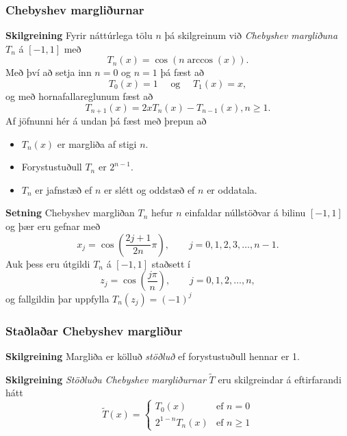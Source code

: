 \documentclass[icelandic,a4paper,12pt]{article}
\begin{document}
\subsubsection{Chebyshev margliðurnar}
 \textbf{Skilgreining}
  Fyrir náttúrlega tölu $n$ þá skilgreinum við \emph{Chebyshev margliðuna}
  $T_n$ á $[-1,1]$ með 
  $$
    T_n(x) = \cos(n \arccos(x)).
  $$
 \pause
 Með því að setja inn $n=0$ og $n=1$ þá fæst að 
 $$
  T_0(x) = 1 \quad \text{ og } \quad T_1(x) = x,
 $$
\pause og með hornafallareglunum fæst að 
  $$
    T_{n+1}(x) = 2xT_n(x) - T_{n-1}(x), n \geq 1.
  $$
\pause
 Af jöfnunni hér á undan þá fæst með þrepun að \pause
  \begin{itemize}
   \item $T_n(x)$ er margliða af stigi $n$.\pause
   \item Forystustuðull $T_n$ er $2^{n-1}$.\pause
   \item $T_n$ er jafnstæð ef $n$ er slétt og oddstæð ef $n$ er oddatala.
  \end{itemize}

 


 \textbf{Setning}
  Chebyshev margliðan $T_n$ hefur $n$ einfaldar núllstöðvar á bilinu $[-1,1]$ \pause
  og þær eru gefnar með 
  $$
    x_j = \cos\left(\frac{2j+1}{2n}\pi\right),\qquad j=0,1,2,3,\ldots,n-1.
  $$\pause
  Auk þess eru útgildi $T_n$ á $[-1,1]$ staðsett í 
  $$
    z_j = \cos\left( \frac{j\pi}{n}\right),\qquad j=0,1,2,\ldots,n,
  $$
  \pause og fallgildin þar uppfylla $T_n(z_j) = (-1)^j$
 



\subsubsection{Staðlaðar Chebyshev margliður}
 \textbf{Skilgreining}
  Margliða er kölluð \emph{stöðluð} ef forystustuðull hennar er 1.
 
 \pause
 \textbf{Skilgreining}
  \emph{Stöðluðu Chebyshev margliðurnar} $\tilde T$ eru skilgreindar á eftirfarandi hátt
  $$
    \tilde T(x) = 
    \begin{cases} 
      T_0(x) & \text{ef } n = 0 \\
      2^{1-n}T_n(x)   & \text{ef } n\geq 1      %
        \end{cases}
   $$
 
\end{document}
